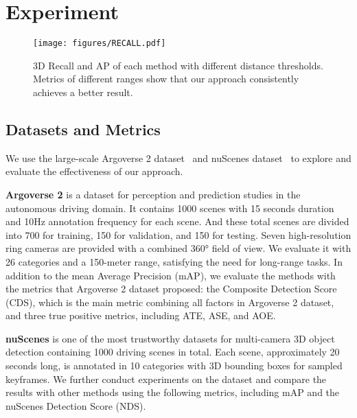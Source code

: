 \documentclass[letterpaper]{article} \usepackage{aaai24}
\begin{document}
 \section{Experiment}

\begin{figure*}[t!]
\centering
\texttt{[image: figures/RECALL.pdf]}
\caption{3D Recall and AP of each method with different distance thresholds. Metrics of different ranges show that our approach consistently achieves a better result.}
\label{recall_ap}
\vspace{-0.3cm}
\end{figure*}

\subsection{Datasets and Metrics}
We use the large-scale Argoverse 2 dataset~\cite{wilson2023argoverse} and nuScenes dataset~\cite{caesar2020nuscenes} to explore and evaluate the effectiveness of our approach.

\textbf{Argoverse 2} is a dataset for perception and prediction studies in the autonomous driving domain. It contains 1000 scenes with 15 seconds duration and 10Hz annotation frequency for each scene. And these total scenes are divided into 700 for training, 150 for validation, and 150 for testing. Seven high-resolution ring cameras are provided with a combined 360° field of view. 
We evaluate it with 26 categories and a 150-meter range, satisfying the need for long-range tasks.
In addition to the mean Average Precision (mAP), we evaluate the methods with the metrics that Argoverse 2 dataset proposed: the Composite Detection Score (CDS), which is the main metric combining all factors in Argoverse 2 dataset, and three true positive metrics, including ATE, ASE, and AOE.

\textbf{nuScenes} is one of the most trustworthy datasets for multi-camera 3D object detection containing 1000 driving scenes in total. Each scene, approximately 20 seconds long, is annotated in 10 categories with 3D bounding boxes for sampled keyframes. We further conduct experiments on the dataset and compare the results with other methods using the following metrics, including mAP and the nuScenes Detection Score (NDS).
\end{document}

